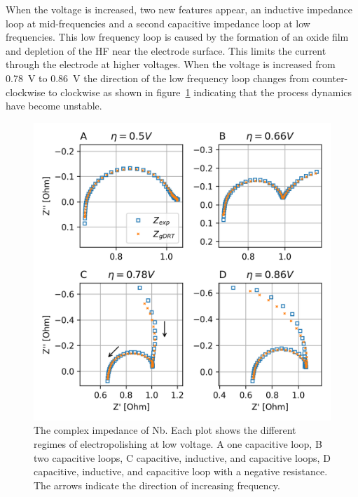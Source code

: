 When the voltage is increased, two new features appear, an inductive impedance loop at mid-frequencies and a second capacitive impedance loop at low frequencies. This low frequency loop is caused by the formation of an oxide film and depletion of the HF near the electrode surface. This limits the current through the electrode at higher voltages. When the voltage is increased from \qty{0.78}{\volt} to \qty{0.86}{\volt} the direction of the low frequency loop changes from counter-clockwise to clockwise as shown in figure~\ref{fig:nyquistplot} indicating that the process dynamics have become unstable.

\begin{figure}[t]
  
  \includegraphics[width=\textwidth]{../figures/nyquist.png}
  \caption{The complex impedance of Nb. Each plot shows the different regimes of electropolishing at low voltage. A one capacitive loop, B two capacitive loops, C capacitive, inductive, and capacitive loops, D capacitive, inductive, and capacitive loop with a negative resistance. The arrows indicate the direction of increasing frequency.}
  \label{fig:nyquistplot}
\end{figure}


